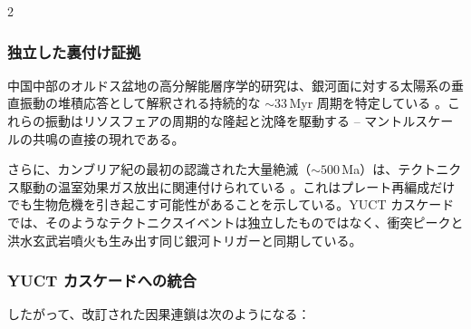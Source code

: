 \documentclass[12pt,a4paper]{article}
\begin{document}
\begin{multicols}{2}
		\subsubsection{独立した裏付け証拠}
		中国中部のオルドス盆地の高分解能層序学的研究は、銀河面に対する太陽系の垂直振動の堆積応答として解釈される持続的な \(\sim 33\) Myr 周期を特定している \cite{Rampino2021}。これらの振動はリソスフェアの周期的な隆起と沈降を駆動する – マントルスケールの共鳴の直接の現れである。
		
		さらに、カンブリア紀の最初の認識された大量絶滅（\(\sim 500\) Ma）は、テクトニクス駆動の温室効果ガス放出に関連付けられている \cite{Jablonski1991}。これはプレート再編成だけでも生物危機を引き起こす可能性があることを示している。YUCT カスケードでは、そのようなテクトニクスイベントは独立したものではなく、衝突ピークと洪水玄武岩噴火も生み出す同じ銀河トリガーと同期している。
		
		\subsubsection{YUCT カスケードへの統合}
		したがって、改訂された因果連鎖は次のようになる：
		
	\end{multicols}
	
	\vspace{0.3cm}
	\noindent
	\vspace{0.3cm}
	
\end{document}
